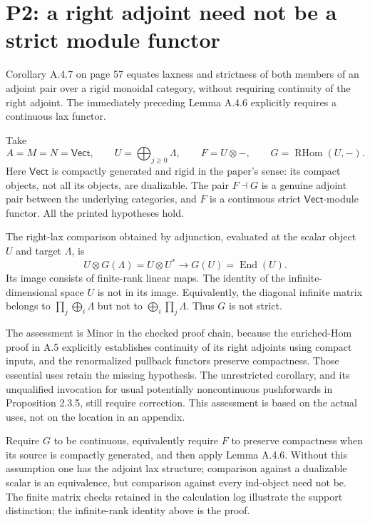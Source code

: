 \documentclass[10pt]{article}
\begin{document}
\section*{P2: a right adjoint need not be a strict module functor}
Corollary A.4.7 on page 57 equates laxness and strictness of both members of an adjoint pair over a rigid monoidal category, without requiring continuity of the right adjoint. The immediately preceding Lemma A.4.6 explicitly requires a continuous lax functor.\par
Take \[A=M=N=\mathsf{Vect},\qquad
U=\bigoplus_{j\geq0}\Lambda,\qquad
F=U\otimes-,\qquad G=\operatorname{RHom}(U,-).\] Here \(\mathsf{Vect}\) is compactly generated and rigid in the paper’s sense: its compact objects, not all its objects, are dualizable. The pair \(F\dashv G\) is a genuine adjoint pair between the underlying categories, and \(F\) is a continuous strict \(\mathsf{Vect}\)-module functor. All the printed hypotheses hold.\par
The right-lax comparison obtained by adjunction, evaluated at the scalar object \(U\) and target \(\Lambda\), is \[U\otimes G(\Lambda)=U\otimes U^*
\longrightarrow G(U)=\operatorname{End}(U).\] Its image consists of finite-rank linear maps. The identity of the infinite-dimensional space \(U\) is not in its image. Equivalently, the diagonal infinite matrix belongs to \(\prod_j\bigoplus_i\Lambda\) but not to \(\bigoplus_i\prod_j\Lambda\). Thus \(G\) is not strict.\par
The assessment is Minor in the checked proof chain, because the enriched-Hom proof in A.5 explicitly establishes continuity of its right adjoints using compact inputs, and the renormalized pullback functors preserve compactness. Those essential uses retain the missing hypothesis. The unrestricted corollary, and its unqualified invocation for usual potentially noncontinuous pushforwards in Proposition 2.3.5, still require correction. This assessment is based on the actual uses, not on the location in an appendix.\par
Require \(G\) to be continuous, equivalently require \(F\) to preserve compactness when its source is compactly generated, and then apply Lemma A.4.6. Without this assumption one has the adjoint lax structure; comparison against a dualizable scalar is an equivalence, but comparison against every ind-object need not be. The finite matrix checks retained in the calculation log illustrate the support distinction; the infinite-rank identity above is the proof.\par
\end{document}
